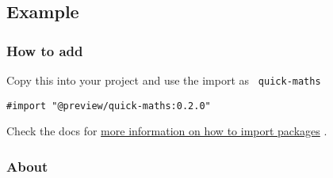 \subsection{Example}\label{example}

\begin{Shaded}
\begin{Highlighting}[]

\NormalTok{)}

\end{Highlighting}
\end{Shaded}

\pandocbounded{}

\subsubsection{How to add}\label{how-to-add}

Copy this into your project and use the import as
\texttt{\ quick-maths\ }

\begin{verbatim}
#import "@preview/quick-maths:0.2.0"
\end{verbatim}



Check the docs for
\href{https://typst.app/docs/reference/scripting/\#packages}{more
information on how to import packages} .

\subsubsection{About}\label{about}

